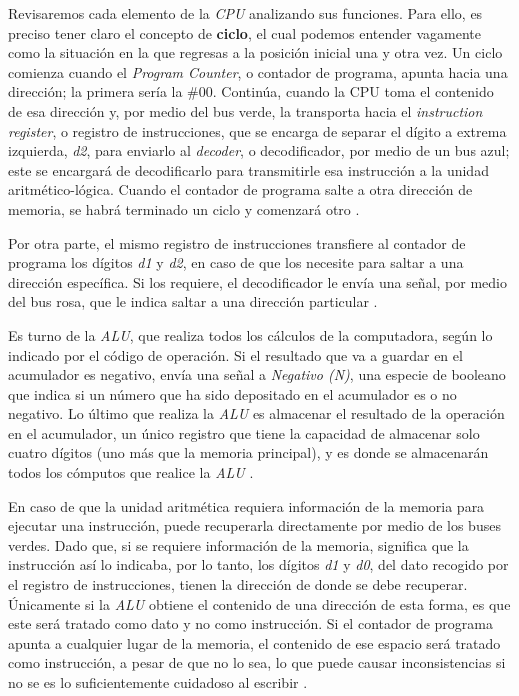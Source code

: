 \documentclass[letterpaper,12pt,oneside]{book}
\begin{document}
	Revisaremos cada elemento de la \textit{CPU} analizando sus funciones. Para ello,
	es preciso tener claro el concepto de \textbf{ciclo}, el cual podemos entender vagamente 
	como la situación en la que regresas a la posición inicial una y otra vez. Un ciclo comienza
	cuando el \textit{Program Counter}, o contador de programa, apunta hacia una dirección;
	la primera sería la \#00. Continúa,
	cuando la CPU toma el contenido de esa dirección y, por medio del bus verde, la transporta hacia el 
	\textit{instruction register}, o registro de instrucciones, que se encarga de separar el dígito a extrema izquierda, \textit{d2},
	para enviarlo al  \textit{decoder}, o decodificador,
	por medio de un bus azul; este se encargará de decodificarlo
	para transmitirle esa instrucción a la 
	unidad aritmético-lógica. Cuando el contador de programa salte a otra dirección de memoria, 
	se habrá terminado un ciclo y
	comenzará otro \cite{fingerman_instruction_1968}. 
 
    Por otra parte, el mismo registro de instrucciones transfiere al contador de programa 
	los dígitos \textit{d1} y \textit{d2},
	en caso de que los necesite para saltar a una dirección específica. Si los requiere, el decodificador 
	le envía una señal, por medio 
	del bus rosa, que le indica saltar a una dirección particular \cite{fingerman_instruction_1968}.
	
	Es turno de la \textit{ALU}, que realiza todos los cálculos de la computadora, según lo indicado por el código de operación.
	Si el resultado que va a guardar
	en el acumulador es negativo, envía una señal a \textit{Negativo (N)},
	una especie de booleano que indica si un número 
	que ha sido depositado en el acumulador es
	o no negativo. Lo último que realiza la \textit{ALU} es almacenar el resultado de la operación
	en el  acumulador, un único registro
	que tiene la capacidad de almacenar solo cuatro dígitos (uno más que la memoria principal), 
	y es donde se almacenarán todos
	los cómputos que realice la \textit{ALU} \cite{fingerman_instruction_1968}. 
	
	En caso de que la unidad aritmética requiera información
	de la memoria  para ejecutar una instrucción,
	puede recuperarla directamente por medio de los buses verdes. Dado que, si se requiere información
	de la memoria, significa que la instrucción así lo indicaba,
	por lo tanto, los dígitos \textit{d1} y \textit{d0}, del dato recogido por el registro
	de instrucciones,
	tienen la dirección de donde se debe recuperar.  Únicamente
	si la \textit{ALU} obtiene el contenido de una dirección de esta forma, es que este
	será tratado como dato y no como instrucción. Si el contador de programa apunta a cualquier
	lugar de la memoria, el contenido de ese espacio será tratado como instrucción, a pesar
	de que no lo sea, lo que puede causar inconsistencias si no se es lo suficientemente
	 cuidadoso al escribir \cite{fingerman_instruction_1968}.
	
\end{document}
